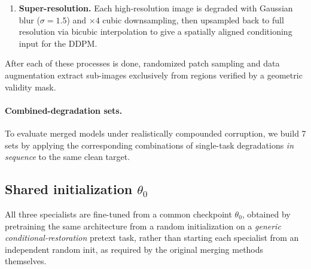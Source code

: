\documentclass{article}
\newcommand{\todo}[1]{\textbf{\color{red}[TODO: #1]}}
\begin{document}
\begin{enumerate}
	\item \textbf{Super-resolution.} Each high-resolution image is degraded with Gaussian blur ($\sigma=1.5$) and $\times4$ cubic downsampling, then upsampled back to full resolution via bicubic interpolation to give a spatially aligned conditioning input for the DDPM.
\end{enumerate}

After each of these processes is done, randomized patch sampling and data augmentation extract sub-images exclusively from regions verified by a geometric validity mask.

\paragraph*{Combined-degradation sets.} To evaluate merged models under realistically compounded corruption, we build 7 sets by applying the corresponding combinations of single-task degradations \emph{in sequence} to the same clean target.


\subsection{Shared initialization $\theta_0$}
\label{sec:theta0}

All three specialists are fine-tuned from a common checkpoint $\theta_0$, obtained by pretraining the same architecture from a random initialization on a \emph{generic conditional-restoration} pretext task, rather than starting each specialist from an independent random init, as required by the original merging methods themselves.
\end{document}
